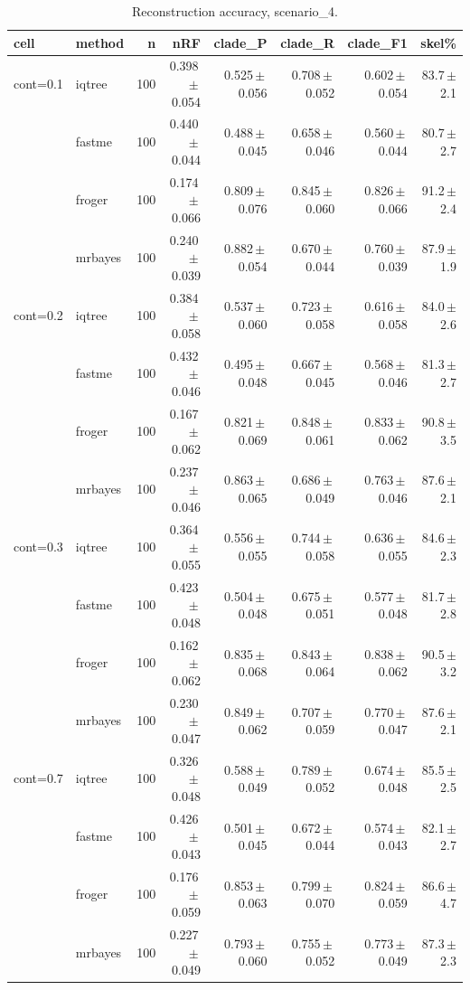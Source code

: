\begin{table}[t]
\centering
\caption{Reconstruction accuracy, scenario\_4.}
\label{tab:scenario4}
\begin{tabular}{ll r rrrrr}
\toprule
cell & method & n & nRF & clade\_P & clade\_R & clade\_F1 & skel\% \\
\midrule
cont=0.1 & iqtree & 100 & 0.398\,$\pm$\,0.054 & 0.525\,$\pm$\,0.056 & 0.708\,$\pm$\,0.052 & 0.602\,$\pm$\,0.054 & 83.7\,$\pm$\,2.1 \\
 & fastme & 100 & 0.440\,$\pm$\,0.044 & 0.488\,$\pm$\,0.045 & 0.658\,$\pm$\,0.046 & 0.560\,$\pm$\,0.044 & 80.7\,$\pm$\,2.7 \\
 & froger & 100 & 0.174\,$\pm$\,0.066 & 0.809\,$\pm$\,0.076 & 0.845\,$\pm$\,0.060 & 0.826\,$\pm$\,0.066 & 91.2\,$\pm$\,2.4 \\
 & mrbayes & 100 & 0.240\,$\pm$\,0.039 & 0.882\,$\pm$\,0.054 & 0.670\,$\pm$\,0.044 & 0.760\,$\pm$\,0.039 & 87.9\,$\pm$\,1.9 \\
cont=0.2 & iqtree & 100 & 0.384\,$\pm$\,0.058 & 0.537\,$\pm$\,0.060 & 0.723\,$\pm$\,0.058 & 0.616\,$\pm$\,0.058 & 84.0\,$\pm$\,2.6 \\
 & fastme & 100 & 0.432\,$\pm$\,0.046 & 0.495\,$\pm$\,0.048 & 0.667\,$\pm$\,0.045 & 0.568\,$\pm$\,0.046 & 81.3\,$\pm$\,2.7 \\
 & froger & 100 & 0.167\,$\pm$\,0.062 & 0.821\,$\pm$\,0.069 & 0.848\,$\pm$\,0.061 & 0.833\,$\pm$\,0.062 & 90.8\,$\pm$\,3.5 \\
 & mrbayes & 100 & 0.237\,$\pm$\,0.046 & 0.863\,$\pm$\,0.065 & 0.686\,$\pm$\,0.049 & 0.763\,$\pm$\,0.046 & 87.6\,$\pm$\,2.1 \\
cont=0.3 & iqtree & 100 & 0.364\,$\pm$\,0.055 & 0.556\,$\pm$\,0.055 & 0.744\,$\pm$\,0.058 & 0.636\,$\pm$\,0.055 & 84.6\,$\pm$\,2.3 \\
 & fastme & 100 & 0.423\,$\pm$\,0.048 & 0.504\,$\pm$\,0.048 & 0.675\,$\pm$\,0.051 & 0.577\,$\pm$\,0.048 & 81.7\,$\pm$\,2.8 \\
 & froger & 100 & 0.162\,$\pm$\,0.062 & 0.835\,$\pm$\,0.068 & 0.843\,$\pm$\,0.064 & 0.838\,$\pm$\,0.062 & 90.5\,$\pm$\,3.2 \\
 & mrbayes & 100 & 0.230\,$\pm$\,0.047 & 0.849\,$\pm$\,0.062 & 0.707\,$\pm$\,0.059 & 0.770\,$\pm$\,0.047 & 87.6\,$\pm$\,2.1 \\
cont=0.7 & iqtree & 100 & 0.326\,$\pm$\,0.048 & 0.588\,$\pm$\,0.049 & 0.789\,$\pm$\,0.052 & 0.674\,$\pm$\,0.048 & 85.5\,$\pm$\,2.5 \\
 & fastme & 100 & 0.426\,$\pm$\,0.043 & 0.501\,$\pm$\,0.045 & 0.672\,$\pm$\,0.044 & 0.574\,$\pm$\,0.043 & 82.1\,$\pm$\,2.7 \\
 & froger & 100 & 0.176\,$\pm$\,0.059 & 0.853\,$\pm$\,0.063 & 0.799\,$\pm$\,0.070 & 0.824\,$\pm$\,0.059 & 86.6\,$\pm$\,4.7 \\
 & mrbayes & 100 & 0.227\,$\pm$\,0.049 & 0.793\,$\pm$\,0.060 & 0.755\,$\pm$\,0.052 & 0.773\,$\pm$\,0.049 & 87.3\,$\pm$\,2.3 \\
\bottomrule
\end{tabular}
\end{table}